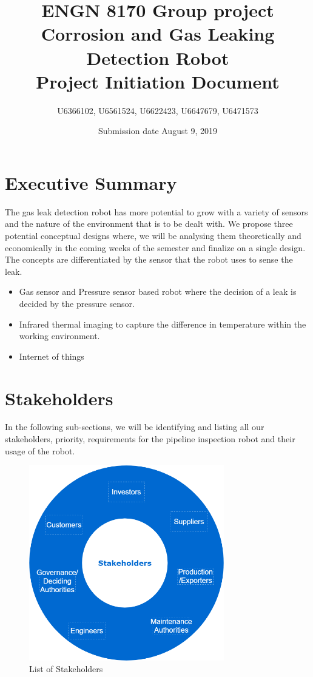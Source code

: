 \documentclass[a4paper]{article}
\title{ENGN 8170 Group project\\ Corrosion and Gas Leaking Detection Robot\\ Project Initiation Document}
\author{U6366102, U6561524, U6622423, U6647679, U6471573}
\date{Submission date August 9, 2019}
\begin{document}
\maketitle
\newpage
\tableofcontents
\newpage
{}
\section{Executive Summary}
The gas leak detection robot has more potential to grow with a variety of sensors and the nature of the environment that is to be dealt with. We propose three potential conceptual designs where, we will be analysing them theoretically and economically in the coming weeks of the semester and finalize on a single design. The concepts are differentiated by the sensor that the robot uses to sense the leak.
\begin{itemize}
    \item {Gas sensor and Pressure sensor based robot where the decision of a leak is decided by the pressure sensor.}
    \item{Infrared thermal imaging to capture the difference in temperature within the working environment.}
    \item{Internet of things} %
\end{itemize}
\section{Stakeholders}
In the following sub-sections, we will be identifying and listing all our stakeholders, priority, requirements for the pipeline inspection robot and their usage of the robot.
\begin{figure}[htbp]
    \centerline{\includegraphics[width=8.5cm]{Stakeholders.png}}
    \caption{List of Stakeholders}
    \label{fig:2.1}
\end{figure}
\end{document}
